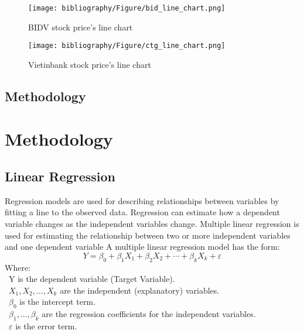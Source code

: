 \documentclass{ieeeojies}
\begin{document}
\begin{figure}[H]
    \centering
    \begin{minipage}{0.23\textwidth}
    \centering
    \texttt{[image: bibliography/Figure/bid\_line\_chart.png]}
    \caption{BIDV stock price's line chart}
    \label{fig:1}
    \end{minipage}
    
\end{figure}\begin{figure}[H]
    \centering
    \begin{minipage}{0.23\textwidth}
    \centering
    \texttt{[image: bibliography/Figure/ctg\_line\_chart.png]}
    \caption{Vietinbank stock price's line chart}
    \label{fig:1}
    \end{minipage}
\end{figure}
\subsection{Methodology}

\section{Methodology}
\subsection{Linear Regression} 
Regression models are used for describing relationships between variables by fitting a line to the observed data. Regression can estimate how a dependent variable changes as the independent variables change. Multiple linear regression is used for estimating the relationship between two or more independent variables and one dependent variable 
A multiple linear regression model has the form: \cite{b7}
\[Y=\beta_0+\beta_1X_1+\beta_2X_2+\cdots+\beta_kX_k+\varepsilon\]
Where:\\
	\indent\textbullet\ Y is the dependent variable (Target Variable).\\
	\indent\textbullet\ \(X_1, X_2, \ldots, X_k\) are the independent (explanatory) variables.\\
	\indent\textbullet\ \(\beta_0\) is the intercept term.\\
	\indent\textbullet\ \(\beta_1,..., \beta_k\) are the regression coefficients for the independent variables.\\
	\indent\textbullet\ \(\varepsilon\) is the error term.
\end{document}

